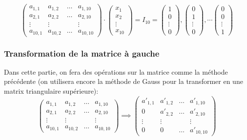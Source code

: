 \documentclass{article}
\begin{document}
\[
\begin{pmatrix} a_{1,1} & a_{1,2} & \ldots & a_{1,10} \\
                a_{2,1} & a_{2,2} & \ldots & a_{2,10} \\
                \vdots & \vdots & & \vdots\\
                a_{10,1} & a_{10,2} & \ldots & a_{10,10}
            \end{pmatrix}\cdot\begin{pmatrix} 
            x_1\\
            x_2\\
            \vdots\\
            x_{10}
            \end{pmatrix}=I_{10} = \begin{pmatrix} 
            1\\
            0\\
            \vdots\\
            0
            \end{pmatrix}, \begin{pmatrix} 
            0\\
            1\\
            \vdots\\
            0
            \end{pmatrix}, \cdots \begin{pmatrix} 
            0\\
            0\\
            \vdots\\
            1
            \end{pmatrix}
\]

\subsubsection{Transformation de la matrice à gauche}

Dans cette partie, on fera des opérations sur la matrice comme la méthode précédente (on utilisera encore la méthode de Gauss pour la transformer en une matrix triangulaire supérieure):\\

\[
            \begin{pmatrix} a_{1,1} & a_{1,2} & \ldots & a_{1,10} \\
                a_{2,1} & a_{2,2} & \ldots & a_{2,10} \\
                \vdots & \vdots & & \vdots\\
                a_{10,1} & a_{10,2} & \ldots & a_{10,10}
            \end{pmatrix} \implies 
            \begin{pmatrix} 
                a'_{1,1} & a'_{1,2} & \ldots & a'_{1, 10}\\
                0 & a'_{2, 2} & \ldots & a'_{2, 10}\\
                \vdots & \vdots & & \vdots\\
                0 & 0 & \ldots & a'_{10, 10}
            \end{pmatrix} 
        \]
\end{document}
